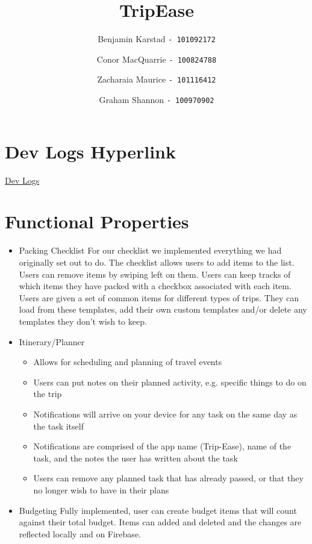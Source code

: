 \documentclass[12pt]{article}
\title{TripEase}
\author{
Benjamin Karstad
\texttt{- 101092172}
\and
Conor MacQuarrie
\texttt{- 100824788}
\and
Zacharaia Maurice
\texttt{- 101116412}
\and
Graham Shannon
\texttt{- 100970902}
}
\begin{document}
	\maketitle

	\section*{Dev Logs Hyperlink}
		\href{https://github.com/theArcticGiant/comp3004-f20/tree/master/app/src/docs/dev logs}{Dev Logs}


	\section*{Functional Properties}

	\begin{itemize}

		\item{Packing Checklist}
		For our checklist we implemented everything we had originally set out to do.
		The checklist allows users to add items to the list. Users can remove items by swiping left on them.
		Users can keep tracks of which items they have packed with a checkbox associated with each item. Users are given a set of common items for different types of trips.
		They can load from these templates, add their own custom templates and/or delete any templates they don't wish to keep.

		\item{Itinerary/Planner}
			\begin{itemize}
				\item Allows for scheduling and planning of travel events
				\item Users can put notes on their planned activity, e.g. specific things to do on the trip
				\item Notifications will arrive on your device for any task on the same day as the task itself
				\item Notifications are comprised of the app name (Trip-Ease), name of the task, and the notes the user has written about the task
				\item Users can remove any planned task that has already passed, or that they no longer wish to have in their plans
			\end{itemize}
		\item{Budgeting}
			Fully implemented, user can create budget items that will count against their total budget.
			Items can added and deleted and the changes are reflected locally and on Firebase.


\end{itemize}
\end{document}
